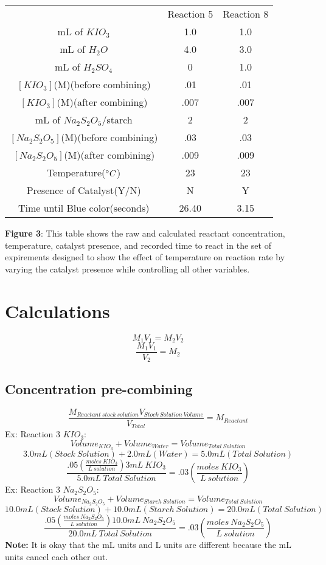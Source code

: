 \documentclass{article}
\begin{document}
\begin{table}[H]
    \begin{center}
    \begin{tabularx}{400pt}{c|c|c} & Reaction 5 & Reaction 8\\
    mL of $KIO_3$ & 1.0 & 1.0 \\
    mL of $H_2O$ & 4.0 & 3.0 \\
    mL of $H_2SO_4$ & 0 & 1.0 \\
    $[KIO_3]$(M)(before combining) & .01 & .01  \\
    $[KIO_3]$(M)(after combining) & .007 & .007 \\
    mL of $Na_2S_2O_5$/starch & 2 & 2 \\
    $[Na_2S_2O_5]$(M)(before combining) & .03 & .03 \\
    $[Na_2S_2O_5]$(M)(after combining) & .009 & .009 \\
    Temperature($\degree C$) & 23 & 23 \\
    Presence of Catalyst(Y/N) & N & Y \\
    Time until Blue color(seconds) & 26.40 & 3.15 \\

    \end{tabularx}
    \end{center}
\end{table}
\textbf{Figure 3}: This table shows the raw and calculated reactant concentration, temperature, catalyst presence, and recorded time to react in the set of expirements designed to show the effect of temperature on reaction rate by varying the catalyst presence while controlling all other variables.
$\ $
\section{Calculations}
$$M_1V_1 =M_2V_2$$
$$\frac{M_1V_1}{V_2} = M_2$$
\subsection{Concentration pre-combining}
$$\frac{M_{Reactant\ stock\ solution}V_{Stock\ Solution\ Volume}}{V_{Total}} = M_{Reactant}$$
Ex: Reaction 3 $KIO_3$: 
$$Volume_{KIO_3} + Volume_{Water} = Volume_{Total\ Solution}$$
$$3.0mL(Stock\ Solution) + 2.0mL(Water) = 5.0mL(Total\ Solution)$$
$$\frac{.05(\frac{moles\ KIO_3}{L\ solution})3mL\ KIO_3}{5.0mL\ Total\ Solution} = .03(\frac{moles\ KIO_3}{L\ solution}) $$
Ex: Reaction 3 $Na_2S_2O_5$: 
$$Volume_{Na_2S_2O_5} + Volume_{Starch\ Solution} = Volume_{Total\ Solution}$$
$$10.0mL(Stock\ Solution) + 10.0mL(Starch\ Solution) = 20.0mL(Total\ Solution)$$
$$\frac{.05(\frac{moles\ Na_2S_2O_5}{L\ solution})10.0mL\ Na_2S_2O_5}{20.0mL\ Total\ Solution} = .03(\frac{moles\ Na_2S_2O_5}{L\ solution}) $$
\textbf{Note:} It is okay that the mL units and L units are different because the mL units cancel each other out. 
\end{document}
